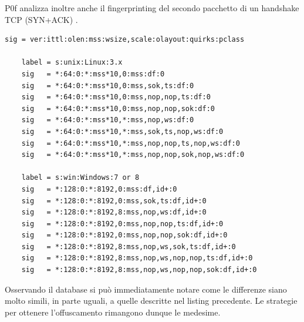 P0f analizza inoltre anche il fingerprinting del secondo pacchetto di un handshake TCP (SYN+ACK) \cite{database_p0f}.

\begin{lstlisting}[caption={Database fingerprinting per pacchetti SYN+ACK dell'handshake TCP}]	
	sig = ver:ittl:olen:mss:wsize,scale:olayout:quirks:pclass

	label = s:unix:Linux:3.x
	sig   = *:64:0:*:mss*10,0:mss:df:0
	sig   = *:64:0:*:mss*10,0:mss,sok,ts:df:0
	sig   = *:64:0:*:mss*10,0:mss,nop,nop,ts:df:0
	sig   = *:64:0:*:mss*10,0:mss,nop,nop,sok:df:0
	sig   = *:64:0:*:mss*10,*:mss,nop,ws:df:0
	sig   = *:64:0:*:mss*10,*:mss,sok,ts,nop,ws:df:0
	sig   = *:64:0:*:mss*10,*:mss,nop,nop,ts,nop,ws:df:0
	sig   = *:64:0:*:mss*10,*:mss,nop,nop,sok,nop,ws:df:0
	
	label = s:win:Windows:7 or 8
	sig   = *:128:0:*:8192,0:mss:df,id+:0
	sig   = *:128:0:*:8192,0:mss,sok,ts:df,id+:0
	sig   = *:128:0:*:8192,8:mss,nop,ws:df,id+:0
	sig   = *:128:0:*:8192,0:mss,nop,nop,ts:df,id+:0
	sig   = *:128:0:*:8192,0:mss,nop,nop,sok:df,id+:0
	sig   = *:128:0:*:8192,8:mss,nop,ws,sok,ts:df,id+:0
	sig   = *:128:0:*:8192,8:mss,nop,ws,nop,nop,ts:df,id+:0
	sig   = *:128:0:*:8192,8:mss,nop,ws,nop,nop,sok:df,id+:0
\end{lstlisting}

Osservando il database si può immediatamente notare come le differenze siano molto simili, in parte uguali, a quelle descritte nel listing precedente.
Le strategie per ottenere l'offuscamento rimangono dunque le medesime.







